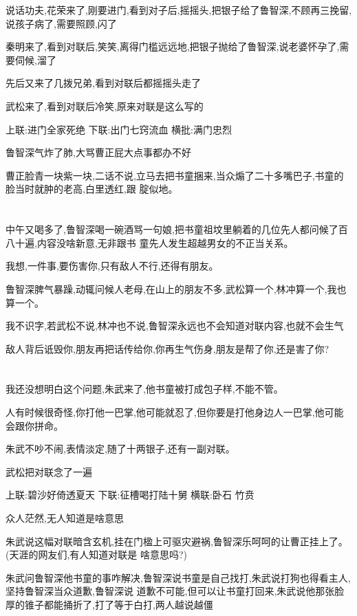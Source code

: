 ﻿\documentclass[12pt]{article}
\begin{document}
说话功夫,花荣来了,刚要进门,看到对子后,摇摇头,把银子给了鲁智深,不顾再三挽留,说孩子病了,需要照顾,闪了

秦明来了,看到对联后,笑笑,离得门槛远远地,把银子抛给了鲁智深,说老婆怀孕了,需要伺候,溜了

先后又来了几拨兄弟,看到对联后都摇摇头走了

武松来了,看到对联后冷笑,原来对联是这么写的

上联:进门全家死绝 下联:出门七窍流血 横批:满门忠烈

鲁智深气炸了肺,大骂曹正屁大点事都办不好

曹正脸青一块紫一块,二话不说,立马去把书童捆来,当众煽了二十多嘴巴子,书童的脸当时就肿的老高,白里透红,跟
腚似地。

\section{}

中午又喝多了,鲁智深喝一碗酒骂一句娘,把书童祖坟里躺着的几位先人都问候了百八十遍,内容没啥新意,无非跟书
童先人发生超越男女的不正当关系。

我想,一件事,要伤害你,只有敌人不行,还得有朋友。

鲁智深脾气暴躁,动辄问候人老母,在山上的朋友不多,武松算一个,林冲算一个,我也算一个。

我不识字,若武松不说,林冲也不说,鲁智深永远也不会知道对联内容,也就不会生气

敌人背后诋毁你,朋友再把话传给你,你再生气伤身,朋友是帮了你,还是害了你? 

\section{}

我还没想明白这个问题,朱武来了,他书童被打成包子样,不能不管。

人有时候很奇怪,你打他一巴掌,他可能就忍了,但你要是打他身边人一巴掌,他可能会跟你拼命。

朱武不吵不闹,表情淡定,随了十两银子,还有一副对联。

武松把对联念了一遍

上联:碧沙好倚透夏天 下联:征槽喝打陆十舅 横联:卧石 竹贲

众人茫然,无人知道是啥意思

朱武说这幅对联暗含玄机,挂在门楹上可驱灾避祸,鲁智深乐呵呵的让曹正挂上了。(天涯的网友们,有人知道对联是
啥意思吗?)

朱武问鲁智深他书童的事咋解决,鲁智深说书童是自己找打,朱武说打狗也得看主人,坚持鲁智深当众道歉,鲁智深说
道歉不可能,但可以让书童打回来,朱武说他那张脸厚的锥子都能捅折了,打了等于白打,两人越说越僵
\end{document}
